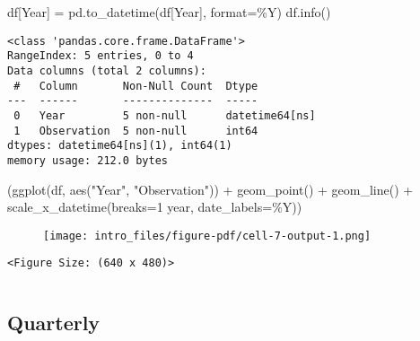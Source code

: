 \documentclass[
  letterpaper,
  DIV=11,
  numbers=noendperiod]{scrreprt}
\newenvironment{Shaded}{\begin{snugshade}}{\end{snugshade}}
\newcommand{\BuiltInTok}[1]{\textcolor[rgb]{0.00,0.23,0.31}{#1}}
\newcommand{\NormalTok}[1]{\textcolor[rgb]{0.00,0.23,0.31}{#1}}
\newcommand{\OperatorTok}[1]{\textcolor[rgb]{0.37,0.37,0.37}{#1}}
\newcommand{\StringTok}[1]{\textcolor[rgb]{0.13,0.47,0.30}{#1}}
\begin{document}
\begin{Shaded}
\begin{Highlighting}[]
\NormalTok{df[}\StringTok{\textquotesingle{}Year\textquotesingle{}}\NormalTok{] }\OperatorTok{=}\NormalTok{ pd.to\_datetime(df[}\StringTok{\textquotesingle{}Year\textquotesingle{}}\NormalTok{], }\BuiltInTok{format}\OperatorTok{=}\StringTok{\textquotesingle{}\%Y\textquotesingle{}}\NormalTok{)}
\NormalTok{df.info()}
\end{Highlighting}
\end{Shaded}

\begin{verbatim}
<class 'pandas.core.frame.DataFrame'>
RangeIndex: 5 entries, 0 to 4
Data columns (total 2 columns):
 #   Column       Non-Null Count  Dtype         
---  ------       --------------  -----         
 0   Year         5 non-null      datetime64[ns]
 1   Observation  5 non-null      int64         
dtypes: datetime64[ns](1), int64(1)
memory usage: 212.0 bytes
\end{verbatim}

\begin{Shaded}
\begin{Highlighting}[]
\NormalTok{(ggplot(df, aes(}\StringTok{"Year"}\NormalTok{, }\StringTok{"Observation"}\NormalTok{))}
 \OperatorTok{+}\NormalTok{ geom\_point() }\OperatorTok{+}\NormalTok{ geom\_line() }\OperatorTok{+} 
\NormalTok{   scale\_x\_datetime(breaks}\OperatorTok{=}\StringTok{\textquotesingle{}1 year\textquotesingle{}}\NormalTok{,  date\_labels}\OperatorTok{=}\StringTok{\textquotesingle{}\%Y\textquotesingle{}}\NormalTok{))}
\end{Highlighting}
\end{Shaded}

\begin{figure}[H]

{\centering \texttt{[image: intro\_files/figure-pdf/cell-7-output-1.png]}

}

\end{figure}

\begin{verbatim}
<Figure Size: (640 x 480)>
\end{verbatim}

\begin{verbatim}
\end{verbatim}

\hypertarget{quarterly}{%
\subsection{Quarterly}\label{quarterly}}
\end{document}
